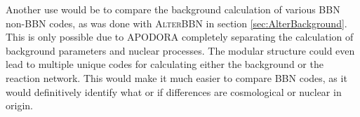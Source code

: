 Another use would be to compare the background calculation of various BBN non-BBN codes, as was done with \textsc{AlterBBN} in section \ref{sec:AlterBackground}. This is only possible due to APODORA completely separating the calculation of background parameters and nuclear processes. The modular structure could even lead to multiple unique codes for calculating either the background or the reaction network. This would make it much easier to compare BBN codes, as it would definitively identify what or if differences are cosmological or nuclear in origin. 


